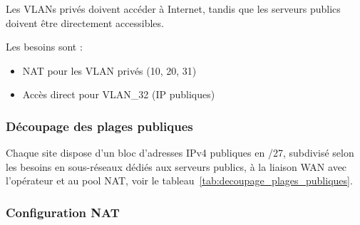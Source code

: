 \documentclass[12pt,a4paper, oneside]{memoir}
\begin{document}
Les VLANs privés doivent accéder à Internet, tandis que les serveurs publics doivent être directement accessibles.

Les besoins sont :
\begin{itemize}
	\item NAT pour les VLAN privés (10, 20, 31)
	\item Accès direct pour VLAN\_32 (IP publiques)
\end{itemize}

\subsubsection{Découpage des plages publiques}

Chaque site dispose d’un bloc d’adresses IPv4 publiques en /27, subdivisé selon les besoins en sous-réseaux dédiés aux serveurs publics, à la liaison WAN avec l’opérateur et au pool NAT, voir le tableau~\ref{tab:decoupage_plages_publiques}.


\subsubsection{Configuration NAT}
\end{document}
